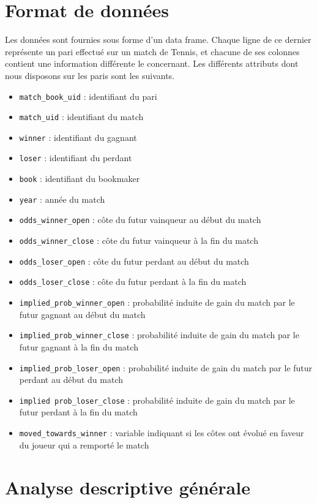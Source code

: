 \documentclass{report}
\begin{document}
\section{Format de données}
Les données sont fournies sous forme d'un data frame. Chaque ligne de ce dernier représente un pari effectué sur un match de Tennis, et chacune de ses colonnes contient une information différente le concernant. Les différents attributs dont nous disposons sur les paris sont les suivants.
\begin{itemize}
  \item \verb+match_book_uid+ : identifiant du pari
  \item \verb+match_uid+ : identifiant du match
  \item \verb+winner+ : identifiant du gagnant
  \item \verb+loser+ : identifiant du perdant
  \item \verb+book+ : identifiant du bookmaker
  \item \verb+year+ : année du match
  \item \verb+odds_winner_open+ : côte du futur vainqueur au début du match
  \item \verb+odds_winner_close+ : côte du futur vainqueur à la fin du match
  \item \verb+odds_loser_open+ : côte du futur perdant au début du match
  \item \verb+odds_loser_close+ : côte du futur perdant à la fin du match
  \item \verb+implied_prob_winner_open+ : probabilité induite de gain du match par le futur gagnant au début du match
  \item \verb+implied_prob_winner_close+ : probabilité induite de gain du match par le futur gagnant à la fin du match
  \item \verb+implied_prob_loser_open+ : probabilité induite de gain du match par le futur perdant au début du match
  \item \verb+implied prob_loser_close+ : probabilité induite de gain du match par le futur perdant à la fin du match
  \item \verb+moved_towards_winner+ : variable indiquant si les côtes ont évolué en faveur du joueur qui a remporté le match
\end{itemize}

\section{Analyse descriptive générale}
\end{document}
